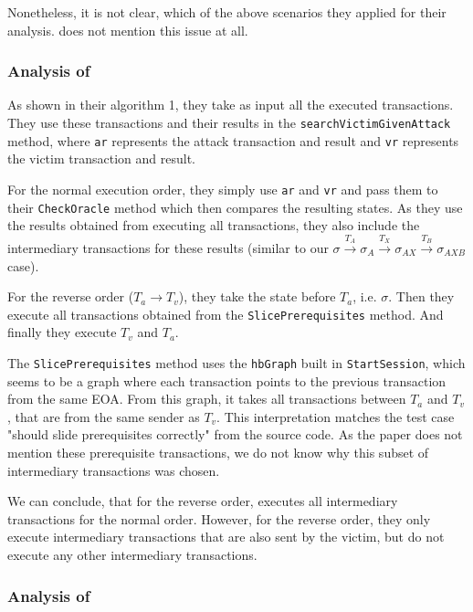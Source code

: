 \documentclass[draft,final]{vutinfth} %
\begin{document}
Nonetheless, it is not clear, which of the above scenarios they applied for their analysis. \cite{torres_frontrunner_2021} does not mention this issue at all.


\subsubsection{Analysis of \cite{zhang_combatting_2023}}


As shown in their algorithm 1, they take as input all the executed transactions. They use these transactions and their results in the \verb|searchVictimGivenAttack| method, where \verb|ar| represents the attack transaction and result and \verb|vr| represents the victim transaction and result.

For the normal execution order, they simply use \verb|ar| and \verb|vr| and pass them to their \verb|CheckOracle| method which then compares the resulting states. As they use the results obtained from executing all transactions, they also include the intermediary transactions for these results (similar to our $\sigma \xrightarrow{T_A} \sigma_A \xrightarrow{T_X} \sigma_{AX} \xrightarrow{T_B} \sigma_{AXB}$ case).

For the reverse order ($T_a \rightarrow T_v$), they take the state before $T_a$, i.e. $\sigma$. Then they execute all transactions obtained from the \verb|SlicePrerequisites| method. And finally they execute $T_v$ and $T_a$.

The \verb|SlicePrerequisites| method uses the \verb|hbGraph| built in \verb|StartSession|, which seems to be a graph where each transaction points to the previous transaction from the same EOA. From this graph, it takes all transactions between $T_a$ and $T_v$, that are from the same sender as $T_v$. This interpretation matches the test case "should slide prerequisites correctly" from the source code. As the paper does not mention these prerequisite transactions, we do not know why this subset of intermediary transactions was chosen.

We can conclude, that for the reverse order, \cite{zhang_combatting_2023} executes all intermediary transactions for the normal order. However, for the reverse order, they only execute intermediary transactions that are also sent by the victim, but do not execute any other intermediary transactions.

\subsubsection{Analysis of \cite{torres_frontrunner_2021}}
\end{document}
